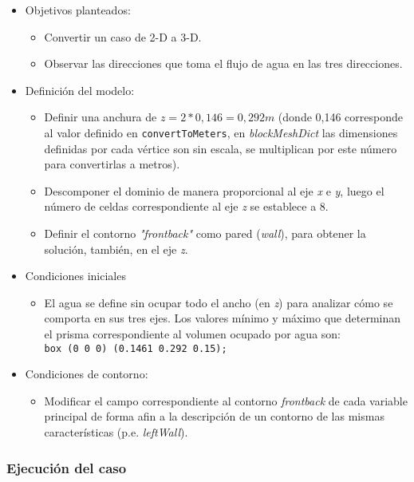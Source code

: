\begin{itemize}
\item
  Objetivos planteados:

  \begin{itemize}
  \item
    Convertir un caso de 2-D a 3-D.
  \item
    Observar las direcciones que toma el flujo de agua en las tres
    direcciones.
  \end{itemize}
\item
  Definición del modelo:

  \begin{itemize}
  \item
    Definir una anchura de \(z=2*0,146=0,292 m\) (donde 0,146
    corresponde al valor definido en \texttt{convertToMeters}, en
    \emph{blockMeshDict} las dimensiones definidas por cada vértice son
    sin escala, se multiplican por este número para convertirlas a
    metros).
  \item
    Descomponer el dominio de manera proporcional al eje \emph{x} e
    \emph{y}, luego el número de celdas correspondiente al eje \emph{z}
    se establece a 8.
  \item
    Definir el contorno \emph{"frontback"} como pared (\emph{wall}),
    para obtener la solución, también, en el eje \emph{z}.
  \end{itemize}
\item
  Condiciones iniciales

  \begin{itemize}
  \item
    El agua se define sin ocupar todo el ancho (en \emph{z}) para
    analizar cómo se comporta en sus tres ejes. Los valores mínimo y
    máximo que determinan el prisma correspondiente al volumen ocupado
    por agua son: \texttt{box\ (0\ 0\ 0)\ (0.1461\ 0.292\ 0.15);}
  \end{itemize}
\item
  Condiciones de contorno:

  \begin{itemize}
  \item
    Modificar el campo correspondiente al contorno \emph{frontback} de
    cada variable principal de forma afin a la descripción de un
    contorno de las mismas características (p.e. \emph{leftWall}).
  \end{itemize}
\end{itemize}

\subsubsection{Ejecución del caso}\label{header-n1027}


